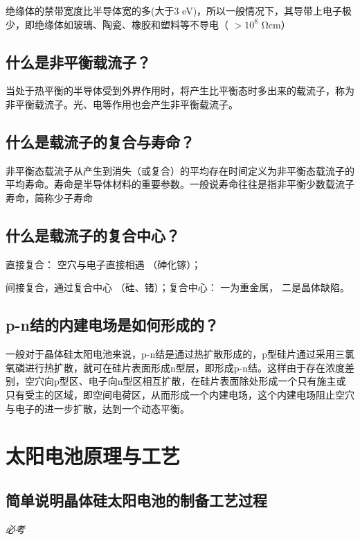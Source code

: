 \documentclass{article}
\begin{document}
    绝缘体的禁带宽度比半导体宽的多(大于3 eV)，所以一般情况下，其导带上电子极少，即绝缘体如玻璃、陶瓷、橡胶和塑料等不导电（ $> 10^8$ Ωcm）

\subsection{什么是非平衡载流子？}

当处于热平衡的半导体受到外界作用时，将产生比平衡态时多出来的载流子，称为非平衡载流子。光、电等作用也会产生非平衡载流子。

\subsection{什么是载流子的复合与寿命？}

非平衡态载流子从产生到消失（或复合）的平均存在时间定义为非平衡态载流子的平均寿命。寿命是半导体材料的重要参数。一般说寿命往往是指非平衡少数载流子寿命，简称少子寿命

\subsection{什么是载流子的复合中心？}

直接复合： 空穴与电子直接相遇 （砷化镓）； 

间接复合，通过复合中心 （硅、锗）；复合中心： 一为重金属， 二是晶体缺陷。 

\subsection{p-n结的内建电场是如何形成的？}

一般对于晶体硅太阳电池来说，p-n结是通过热扩散形成的，p型硅片通过采用三氯氧磷进行热扩散，就可在硅片表面形成n型层，即形成p-n结。这样由于存在浓度差别，空穴向p型区、电子向n型区相互扩散，在硅片表面除处形成一个只有施主或只有受主的区域，即空间电荷区，从而形成一个内建电场，这个内建电场阻止空穴与电子的进一步扩散，达到一个动态平衡。

\section{太阳电池原理与工艺}

\subsection{简单说明晶体硅太阳电池的制备工艺过程}

\emph{必考}
\end{document}
